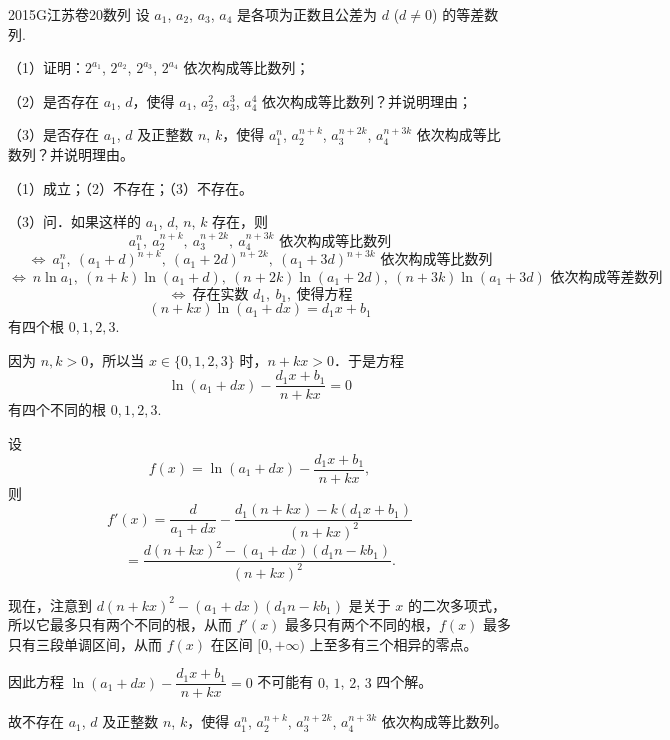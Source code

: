 
\begin{problem}{2015}{G}{江苏卷}{20}{数列}
设 $ a_1 $, $ a_2 $, $ a_3 $, $ a_4 $ 是各项为正数且公差为 $ d $ ($ d\neq 0 $) 的等差数列.

（1）证明：$ 2^{a_1} $, $ 2^{a_2} $, $ 2^{a_3} $, $ 2^{a_4} $ 依次构成等比数列；

（2）是否存在 $ a_1 $, $ d $，使得 $ a_1 $, $ a_2^2 $, $ a_3^3 $, $ a_4^4 $ 依次构成等比数列？并说明理由；

（3）是否存在 $ a_1 $, $ d $ 及正整数 $ n $, $ k $，使得 $ a_1^n $, $ a_2^{n+k} $, $ a_3^{n+2k} $, $ a_4^{n+3k} $ 依次构成等比数列？并说明理由。
\end{problem}

\begin{answer}
（1）成立；（2）不存在；（3）不存在。
\end{answer}

\begin{solutions}
（3）问．如果这样的 $ a_1 $, $ d $, $ n $, $ k $ 存在，则  
$$
a_1^n,\ a_2^{n+k},\ a_3^{n+2k},\ a_4^{n+3k} \text{ 依次构成等比数列}
$$  
$$
\Longleftrightarrow\ a_1^n,\ (a_1+d)^{n+k},\ (a_1+2d)^{n+2k},\ (a_1+3d)^{n+3k} \text{ 依次构成等比数列}
$$  
$$
\Longleftrightarrow\ n\ln a_1,\ (n+k)\ln(a_1+d),\ (n+2k)\ln(a_1+2d),\ (n+3k)\ln(a_1+3d) \text{ 依次构成等差数列}
$$  
$$
\Longleftrightarrow\ \text{存在实数 } d_1,\ b_1,\ \text{使得方程}
$$  
$$
(n+kx)\ln(a_1+dx)=d_1x+b_1
$$  
有四个根 $ 0,1,2,3 $.  

因为 $ n,k>0 $，所以当 $ x\in\{0,1,2,3\} $ 时，$ n+kx>0 $．于是方程  
$$
\ln(a_1+dx)-\frac{d_1x+b_1}{n+kx}=0
$$  
有四个不同的根 $ 0,1,2,3 $.  

设  
$$
f(x)=\ln(a_1+dx)-\frac{d_1x+b_1}{n+kx},
$$  
则  
$$
f'(x)=\frac{d}{a_1+dx}-\frac{d_1(n+kx)-k(d_1x+b_1)}{(n+kx)^2}
$$  
$$
=\frac{d(n+kx)^2-(a_1+dx)(d_1n-kb_1)}{(n+kx)^2}.
$$  

现在，注意到 $ d(n+kx)^2-(a_1+dx)(d_1n-kb_1) $ 是关于 $ x $ 的二次多项式，所以它最多只有两个不同的根，从而 $ f'(x) $ 最多只有两个不同的根，$ f(x) $ 最多只有三段单调区间，从而 $ f(x) $ 在区间 $ [0,+\infty) $ 上至多有三个相异的零点。  

因此方程 $ \ln(a_1+dx)-\dfrac{d_1x+b_1}{n+kx}=0 $ 不可能有 $ 0 $, $ 1 $, $ 2 $, $ 3 $ 四个解。  

故不存在 $ a_1 $, $ d $ 及正整数 $ n $, $ k $，使得 $ a_1^n $, $ a_2^{n+k} $, $ a_3^{n+2k} $, $ a_4^{n+3k} $ 依次构成等比数列。
\end{solutions}